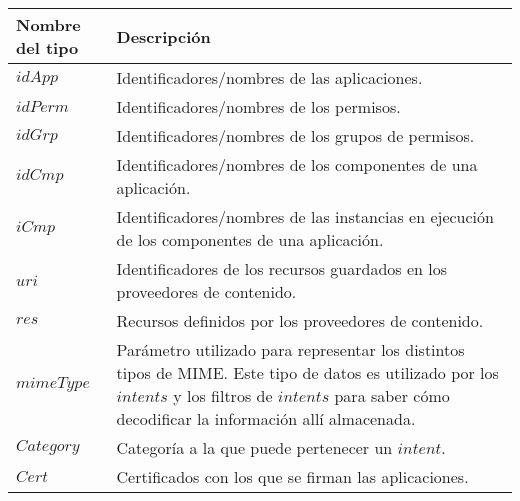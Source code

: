 
\begin{table}[thb!]
    \centering
    \begin{tabularx}{\linewidth}{|l X|}
        \hline
        \textbf{Nombre del tipo} & \textbf{Descripción}                                                                                                  \\
        \hline
        $idApp$                  & Identificadores/nombres de las aplicaciones.                                                                          \\
        \hline
        $idPerm$                 & Identificadores/nombres de los permisos.                                                                              \\
        \hline
        $idGrp$                  & Identificadores/nombres de los grupos de permisos.                                                                    \\
        \hline
        $idCmp$                  & Identificadores/nombres de los componentes de una aplicación.                                                         \\
        \hline
        $iCmp$                   & Identificadores/nombres de las instancias en ejecución de los componentes de una aplicación.                          \\
        \hline
        $uri$                    & Identificadores de los recursos guardados en los proveedores de contenido.                                            \\
        \hline
        $res$                    & Recursos definidos por los proveedores de contenido.                                                                  \\
        \hline
        $mimeType$               & Parámetro utilizado para representar los distintos tipos de
        MIME\cite{mime-types}. Este tipo de datos es utilizado por los $intents$ y los filtros de
        $intents$ para saber cómo decodificar la información allí almacenada.                                                                            \\
        \hline
        $Category$               & Categoría a la que puede pertenecer un $intent$.                                                                      \\
        \hline
        $Cert$                   & Certificados con los que se firman las aplicaciones.                                                                  \\

\end{tabularx}
\end{table}
